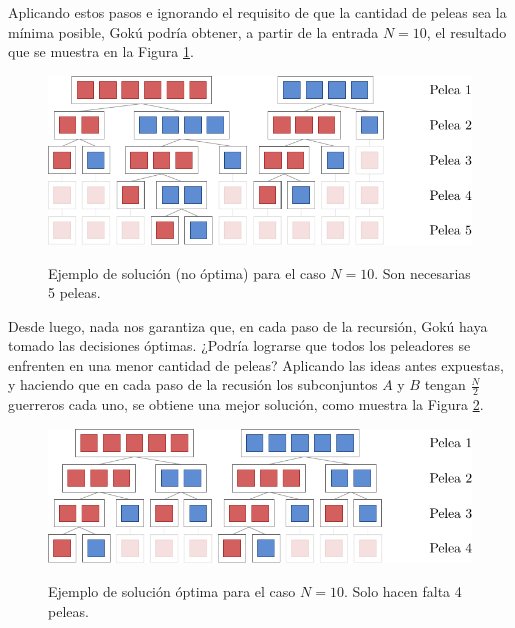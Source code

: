         Aplicando estos pasos e ignorando el requisito de que la cantidad de peleas sea la mínima posible, Gokú podría obtener, a partir de la entrada $N = 10$, el resultado que se muestra en la Figura \ref{fig:ej1-non-optimal-example}.

        \begin{figure}[h]
          \centering

          \includegraphics{imagenes/ej1-non-optimal-example.pdf} \vspace{1em} \\

          \caption{Ejemplo de solución (no óptima) para el caso $N = 10$. Son necesarias 5 peleas.}
          \label{fig:ej1-non-optimal-example}
        \end{figure}

        Desde luego, nada nos garantiza que, en cada paso de la recursión, Gokú haya tomado las decisiones óptimas. ¿Podría lograrse que todos los peleadores se enfrenten en una menor cantidad de peleas? Aplicando las ideas antes expuestas, y haciendo que en cada paso de la recusión los subconjuntos $A$ y $B$ tengan $\frac{N}{2}$ guerreros cada uno, se obtiene una mejor solución, como muestra la Figura \ref{fig:ej1-optimal-example}.

        \begin{figure}[h]
          \centering

          \includegraphics{imagenes/ej1-optimal-example.pdf} \vspace{1em} \\

          \caption{Ejemplo de solución óptima para el caso $N = 10$. Solo hacen falta 4 peleas.}
          \label{fig:ej1-optimal-example}
        \end{figure}

